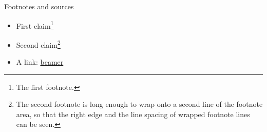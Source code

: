\begin{standardframe}{Footnotes and sources}
	\begin{itemize}
		\item First claim\footnote{The first footnote.}
		\item Second claim\footnote{The second footnote is long enough to wrap onto a second line of the footnote area, so that the right edge and the line spacing of wrapped footnote lines can be seen.}
		\item A link: \href{https://ctan.org/pkg/beamer}{beamer}
	\end{itemize}
\end{standardframe}
